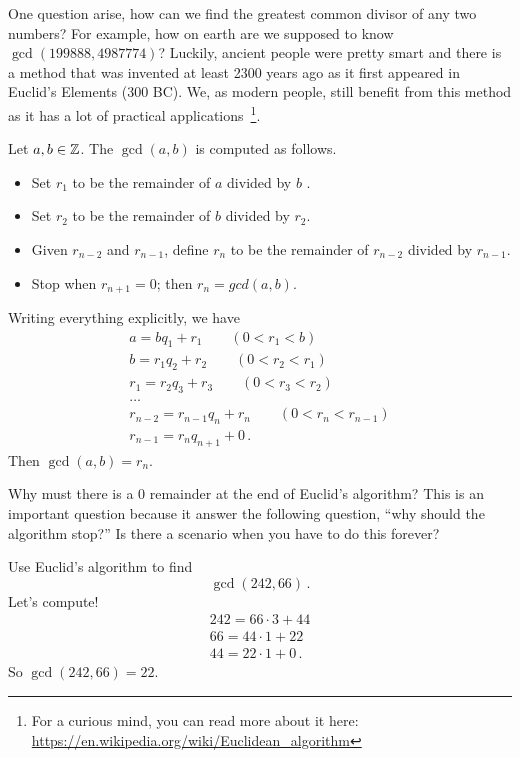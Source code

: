 One question arise, how can we find the greatest common divisor of any two numbers?
For example, how on earth are we supposed to know $\gcd(199888,4987774)$?
Luckily, ancient people were pretty smart and there is a method that was invented
at least 2300 years ago as it first appeared in Euclid's Elements (300 BC).
We, as modern people, still benefit from this method as it has a lot of practical applications~\footnote{For a curious mind, you can read more about it here: \url{https://en.wikipedia.org/wiki/Euclidean_algorithm}}.

\begin{theorem}
    Let $a,b \in \mathbb{Z}$. The $\gcd(a,b)$ is computed as follows.
    \begin{itemize}
        \item Set $r_1$ to be the remainder of $a$ divided by $b$ .
        \item Set $r_2$ to be the remainder of $b$ divided by $r_2$.
        \item Given $r_{n-2}$ and $r_{n-1}$, define $r_n$ to be 
            the remainder of $r_{n-2}$ divided by $r_{n-1}$.
        \item Stop when $r_{n+1} = 0$; then $r_{n} = gcd(a,b)$.
    \end{itemize}
\end{theorem}
Writing everything explicitly, we have
   \begin{gather*}
       a = bq_1 + r_1 \qquad ( 0< r_1 < b)\\ 
       b = r_1q_2 + r_2 \qquad ( 0< r_2 < r_1)\\ 
       r_1 = r_2 q_3 + r_3 \qquad ( 0< r_3 < r_2) \\
       \dots \\
       r_{n-2} = r_{n-1} q_{n} + r_n \qquad ( 0< r_n < r_{n-1}) \\
       r_{n-1} = r_n q_{n+1} + 0  \,.
   \end{gather*}
Then $\gcd(a,b) = r_n$.

\begin{exercise}
   Why must there is a $0$ remainder at the end of Euclid's algorithm?
   This is an important question because it answer the following question,
   ``why should the algorithm stop?''
   Is there a scenario when you have to do this forever?
\end{exercise}

\begin{example}
   Use Euclid's algorithm to find
   \begin{equation*}
       \gcd(242, 66)\,.
   \end{equation*}
    Let's compute!
    \begin{gather*}
       242 = 66\cdot 3 + 44\\
       66 = 44\cdot 1 + 22\\
       44 = 22\cdot 1 + 0\,.
    \end{gather*}
    So $\gcd(242,66) = 22$.
\end{example}


